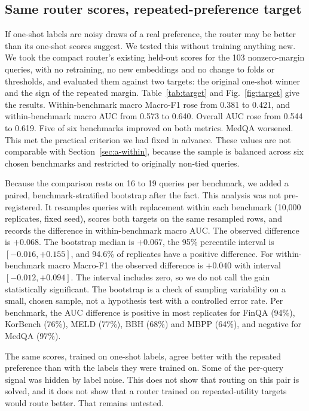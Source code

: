 \documentclass[lettersize,journal]{IEEEtran}
\begin{document}
\subsection{Same router scores, repeated-preference target}
\label{sec:a-target}
If one-shot labels are noisy draws of a real preference, the router may be better than its one-shot scores suggest. We tested this without training anything new. We took the compact router's existing held-out scores for the 103 nonzero-margin queries, with no retraining, no new embeddings and no change to folds or thresholds, and evaluated them against two targets: the original one-shot winner and the sign of the repeated margin. Table~\ref{tab:target} and Fig.~\ref{fig:target} give the results. Within-benchmark macro Macro-F1 rose from 0.381 to 0.421, and within-benchmark macro AUC from 0.573 to 0.640. Overall AUC rose from 0.544 to 0.619. Five of six benchmarks improved on both metrics. MedQA worsened. This met the practical criterion we had fixed in advance. These values are not comparable with Section~\ref{sec:a-within}, because the sample is balanced across six chosen benchmarks and restricted to originally non-tied queries.

Because the comparison rests on 16 to 19 queries per benchmark, we added a paired, benchmark-stratified bootstrap after the fact. This analysis was not pre-registered. It resamples queries with replacement within each benchmark (10,000 replicates, fixed seed), scores both targets on the same resampled rows, and records the difference in within-benchmark macro AUC. The observed difference is $+0.068$. The bootstrap median is $+0.067$, the 95\% percentile interval is $[-0.016, +0.155]$, and 94.6\% of replicates have a positive difference. For within-benchmark macro Macro-F1 the observed difference is $+0.040$ with interval $[-0.012, +0.094]$. The interval includes zero, so we do not call the gain statistically significant. The bootstrap is a check of sampling variability on a small, chosen sample, not a hypothesis test with a controlled error rate. Per benchmark, the AUC difference is positive in most replicates for FinQA (94\%), KorBench (76\%), MELD (77\%), BBH (68\%) and MBPP (64\%), and negative for MedQA (97\%).

The same scores, trained on one-shot labels, agree better with the repeated preference than with the labels they were trained on. Some of the per-query signal was hidden by label noise. This does not show that routing on this pair is solved, and it does not show that a router trained on repeated-utility targets would route better. That remains untested.
\end{document}
